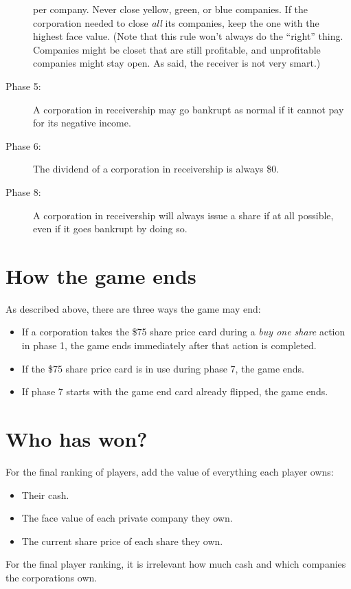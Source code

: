 \documentclass[10pt,final]{report}
\begin{document}
\begin{multicols}{2}
\begin{description}
  per company. Never close yellow, green, or blue companies. If the
  corporation needed to close \emph{all} its companies, keep the one
  with the highest face value. (Note that this rule won't always do
  the ``right'' thing. Companies might be closet that are still
  profitable, and unprofitable companies might stay open. As said, the
  receiver is not very smart.)
\item[Phase 5:] A corporation in receivership may go bankrupt as
  normal if it cannot pay for its negative income.
\item[Phase 6:] The dividend of a corporation in receivership is
  always \$0.
\item[Phase 8:] A corporation in receivership will always issue a
  share if at all possible, even if it goes bankrupt by doing so.
\end{description}

\section{How the game ends}
\label{end}

As described above, there are three ways the game may end:
\begin{itemize}
\item If a corporation takes the \$75 share price card during a
  \emph{buy one share} action in phase 1, the game ends immediately
  after that action is completed.
\item If the \$75 share price card is in use during phase 7, the
  game ends.
\item If phase 7 starts with the game end card already flipped, the
  game ends.
\end{itemize}

\section{Who has won?}
\label{win}

For the final ranking of players, add the value of everything each
player owns:
\begin{itemize}
\item Their cash.
\item The face value of each private company they own.
\item The current share price of each share they own.
\end{itemize}

For the final player ranking, it is irrelevant how much cash and which
companies the corporations own.


\end{multicols}
\end{document}
